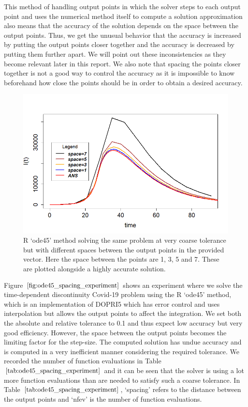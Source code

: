 This method of handling output points in which the solver steps to each output point and uses the numerical method itself to compute a solution approximation also means that the accuracy of the solution depends on the space between the output points. Thus, we get the unusual behavior that the accuracy is increased by putting the output points closer together and the accuracy is decreased by putting them further apart. We will point out these inconsistencies as they become relevant later in this report. We also note that spacing the points closer together is not a good way to control the accuracy as it is impossible to know beforehand how close the points should be in order to obtain a desired accuracy.

\begin{figure}[H]
\centering
\includegraphics[width=0.7\linewidth]{./figures/R_ode45_spacing_experiment}
\caption{R `ode45' method solving the same problem at very coarse tolerance but with different spaces between the output points in the provided vector. Here the space between the points are 1, 3, 5 and 7. These are plotted alongside a highly accurate solution.}
\label{fig:ode45_spacing_experiment}
\end{figure}

Figure $\ref{fig:ode45_spacing_experiment}$ shows an experiment where we solve the time-dependent discontinuity Covid-19 problem using the R `ode45' method, which is an implementation of DOPRI5 which has error control and uses interpolation but allows the output points to affect the integration. We set both the absolute and relative tolerance to 0.1 and thus expect low accuracy but very good efficiency. However, the space between the output points becomes the limiting factor for the step-size. The computed solution has undue accuracy and is computed in a very inefficient manner considering the required tolerance. We recorded the number of function evaluations in Table $\ref{tab:ode45_spacing_experiment}$ and it can be seen that the solver is using a lot more function evaluations than are needed to satisfy such a coarse tolerance. In Table $\ref{tab:ode45_spacing_experiment}$, `spacing' refers to the distance between the output points and `nfev' is the number of function evaluations.

